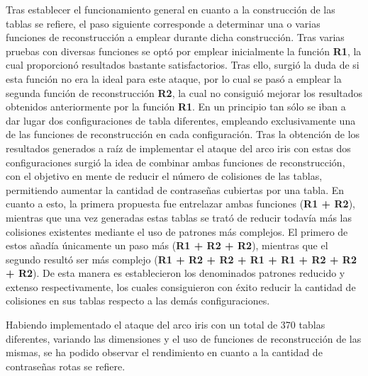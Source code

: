 \documentclass[12pt,spanish,listoffigures,listoftables,listofalgorithms]{tfgetsinf}
\begin{document}
Tras establecer el funcionamiento general en cuanto a la construcción de las tablas se refiere, el paso siguiente corresponde a determinar una o varias funciones de reconstrucción a emplear durante dicha construcción. Tras varias pruebas con diversas funciones se optó por emplear inicialmente la función \textbf{R1}, la cual proporcionó resultados bastante satisfactorios. Tras ello, surgió la duda de si esta función no era la ideal para este ataque, por lo cual se pasó a emplear la segunda función de reconstrucción \textbf{R2}, la cual no consiguió mejorar los resultados obtenidos anteriormente por la función \textbf{R1}. En un principio tan sólo se iban a dar lugar dos configuraciones de tabla diferentes, empleando exclusivamente una de las funciones de reconstrucción en cada configuración. Tras la obtención de los resultados generados a raíz de implementar el ataque del arco iris con estas dos configuraciones surgió la idea de combinar ambas funciones de reconstrucción, con el objetivo en mente de reducir el número de colisiones de las tablas, permitiendo aumentar la cantidad de contraseñas cubiertas por una tabla. En cuanto a esto, la primera propuesta fue entrelazar ambas funciones (\textbf{R1 + R2}), mientras que una vez generadas estas tablas se trató de reducir todavía más las colisiones existentes mediante el uso de patrones más complejos. El primero de estos añadía únicamente un paso más (\textbf{R1 + R2 + R2}), mientras que el segundo resultó ser más complejo (\textbf{R1 + R2 + R2 + R1 + R1 + R2 + R2 + R2}). De esta manera es establecieron los denominados patrones reducido y extenso respectivamente, los cuales consiguieron con éxito reducir la cantidad de colisiones en sus tablas respecto a las demás configuraciones.

Habiendo implementado el ataque del arco iris con un total de 370 tablas diferentes, variando las dimensiones y el uso de funciones de reconstrucción de las mismas, se ha podido observar el rendimiento en cuanto a la cantidad de contraseñas rotas se refiere.
\end{document}

